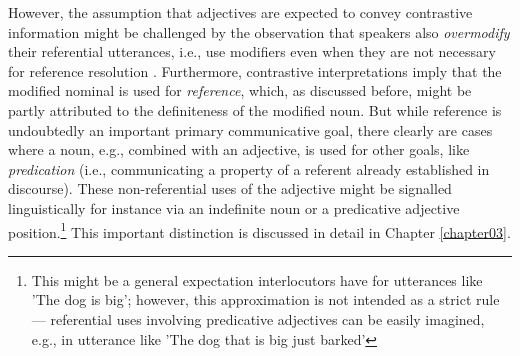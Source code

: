 However, the assumption that adjectives are expected to convey contrastive information might be challenged by the observation that speakers also \textit{overmodify} their referential utterances, i.e., use modifiers even when they are not necessary for reference resolution \parencite{degen2020redundancy}.  Furthermore, contrastive interpretations imply that the modified nominal is used for \textit{reference}, which, as discussed before, might be partly attributed to the definiteness of the modified noun. But while reference is undoubtedly an important primary communicative goal, there clearly are cases where a noun, e.g., combined with an adjective, is used for other goals, like \textit{predication} (i.e., communicating a property of a referent already established in discourse). These non-referential uses of the adjective might be signalled linguistically for instance via an indefinite noun or a predicative adjective position.\footnote{This might be a general expectation interlocutors have for utterances like 'The dog is big'; however, this approximation is not intended as a strict rule --- referential uses involving predicative adjectives can be easily imagined, e.g., in utterance like 'The dog that is big just barked'}   %
This important distinction is discussed in detail in Chapter \ref{chapter03}.  

